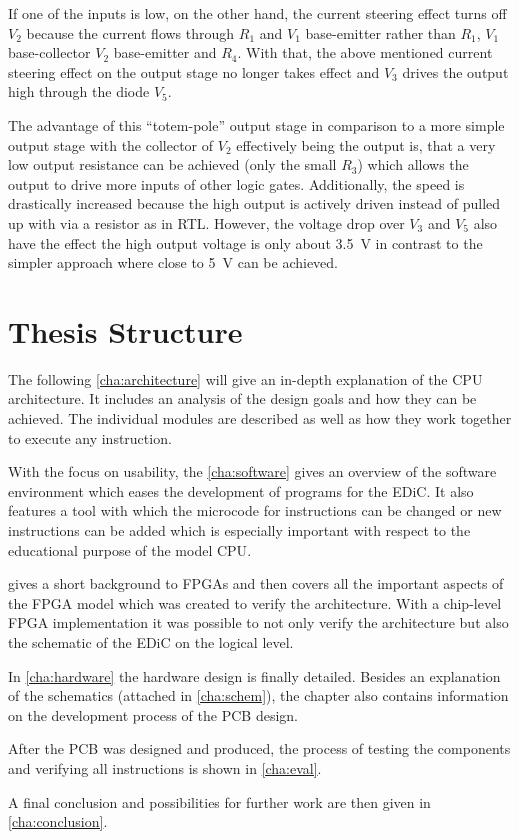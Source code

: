 If one of the inputs is low, on the other hand, the current steering effect turns off $V_2$ because the current flows through $R_1$ and $V_1$ base-emitter rather than $R_1$, $V_1$ base-collector $V_2$ base-emitter and $R_4$.
With that, the above mentioned current steering effect on the output stage no longer takes effect and $V_3$ drives the output high through the diode $V_5$.

The advantage of this ``totem-pole'' output stage in comparison to a more simple output stage with the collector of $V_2$ effectively being the output is, that a very low output resistance can be achieved (only the small $R_3$) which allows the output to drive more inputs of other logic gates.
Additionally, the speed is drastically increased because the high output is actively driven instead of pulled up with via a resistor as in \gls{RTL}.
However, the voltage drop over $V_3$ and $V_5$ also have the effect the high output voltage is only about \qty{3.5}{\volt} in contrast to the simpler approach where close to \qty{5}{\volt} can be achieved.


\section{Thesis Structure}
The following \cref{cha:architecture} will give an in-depth explanation of the \gls{CPU} architecture.
It includes an analysis of the design goals and how they can be achieved.
The individual modules are described as well as how they work together to execute any instruction.

With the focus on usability, the \cref{cha:software} gives an overview of the software environment which eases the development of programs for the \gls{EDiC}.
It also features a tool with which the microcode for instructions can be changed or new instructions can be added which is especially important with respect to the educational purpose of the model \gls{CPU}.

 gives a short background to \glspl{FPGA} and then covers all the important aspects of the \gls{FPGA} model which was created to verify the architecture.
With a chip-level \gls{FPGA} implementation it was possible to not only verify the architecture but also the schematic of the \gls{EDiC} on the logical level.

In \cref{cha:hardware} the hardware design is finally detailed.
Besides an explanation of the schematics (attached in \cref{cha:schem}), the chapter also contains  information on the development process of the \gls{PCB} design.

After the \gls{PCB} was designed and produced, the process of testing the components and verifying all instructions is shown in \cref{cha:eval}.

A final conclusion and possibilities for further work are then given in \cref{cha:conclusion}.
